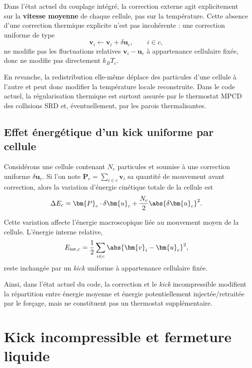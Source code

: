 \documentclass[11pt,a4paper]{article}
\begin{document}
Dans l'état actuel du couplage intégré, la correction externe agit explicitement sur la \textbf{vitesse moyenne} de chaque cellule, pas sur la température. Cette absence d'une correction thermique explicite n'est pas incohérente : une correction uniforme de type
\begin{equation}
 \bm{v}_i \leftarrow \bm{v}_i + \delta \bm{u}_c,
 \qquad i\in c,
\end{equation}
ne modifie pas les fluctuations relatives $\bm{v}_i-\bm{u}_c$ à appartenance cellulaire fixée, donc ne modifie pas directement $k_B T_c$.

En revanche, la redistribution elle-même déplace des particules d'une cellule à l'autre et peut donc modifier la température locale reconstruite. Dans le code actuel, la régularisation thermique est surtout assurée par le thermostat MPCD des collisions SRD et, éventuellement, par les parois thermalisantes.

\subsection{Effet énergétique d'un kick uniforme par cellule}

Considérons une cellule contenant $N_c$ particules et soumise à une correction uniforme $\delta \bm{u}_c$. Si l'on note $\bm{P}_c = \sum_{i\in c} \bm{v}_i$ sa quantité de mouvement avant correction, alors la variation d'énergie cinétique totale de la cellule est
\begin{equation}
 \Delta E_c = \bm{P}_c\cdot \delta \bm{u}_c + \frac{N_c}{2}\abs{\delta \bm{u}_c}^2.
\end{equation}

Cette variation affecte l'énergie macroscopique liée au mouvement moyen de la cellule. L'énergie interne relative,
\begin{equation}
 E_{\mathrm{int},c} = \frac{1}{2}\sum_{i\in c}\abs{\bm{v}_i-\bm{u}_c}^2,
\end{equation}
reste inchangée par un \emph{kick} uniforme à appartenance cellulaire fixée.

Ainsi, dans l'état actuel du code, la correction et le \emph{kick} incompressible modifient la répartition entre énergie moyenne et énergie potentiellement injectée/retraitée par le forçage, mais ne constituent pas un thermostat supplémentaire.

\section{Kick incompressible et fermeture liquide}
\end{document}
